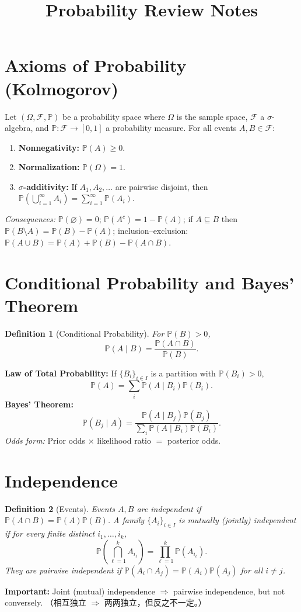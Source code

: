 \documentclass[11pt]{article}
\title{Probability Review Notes}
\author{}
\date{}
\newtheorem{definition}{Definition}
\newcommand{\Pbb}{\mathbb{P}}
\newcommand{\1}{\mathbf{1}}
\begin{document}
\maketitle

\section{Axioms of Probability (Kolmogorov)}
Let $(\Omega,\mathcal{F},\Pbb)$ be a probability space where $\Omega$ is the sample space, $\mathcal{F}$ a $\sigma$-algebra, and $\Pbb:\mathcal{F}\to[0,1]$ a probability measure. For all events $A,B\in\mathcal{F}$:
\begin{enumerate}[label=(\alph*)]
  \item \textbf{Nonnegativity:} $\Pbb(A)\ge 0$.
  \item \textbf{Normalization:} $\Pbb(\Omega)=1$.
  \item \textbf{$\sigma$-additivity:} If $A_1,A_2,\dots$ are pairwise disjoint, then
  $\Pbb\!\left(\bigcup_{i=1}^\infty A_i\right) = \sum_{i=1}^\infty \Pbb(A_i)$.
\end{enumerate}
\textit{Consequences:} $\Pbb(\varnothing)=0$; $\Pbb(A^c)=1-\Pbb(A)$; if $A\subseteq B$ then $\Pbb(B\setminus A)=\Pbb(B)-\Pbb(A)$; inclusion–exclusion:
$\Pbb(A\cup B)=\Pbb(A)+\Pbb(B)-\Pbb(A\cap B)$.

\section{Conditional Probability and Bayes' Theorem}
\begin{definition}[Conditional Probability]
For $\Pbb(B)>0$,
\[
  \Pbb(A\mid B)=\frac{\Pbb(A\cap B)}{\Pbb(B)}.
\]
\end{definition}
\noindent\textbf{Law of Total Probability:} If $\{B_i\}_{i\in I}$ is a partition with $\Pbb(B_i)>0$,
\[
  \Pbb(A)=\sum_{i}\Pbb(A\mid B_i)\Pbb(B_i).
\]
\noindent\textbf{Bayes' Theorem:}
\[
  \Pbb(B_j\mid A)=\frac{\Pbb(A\mid B_j)\Pbb(B_j)}{\sum_i \Pbb(A\mid B_i)\Pbb(B_i)}.
\]
\textit{Odds form:} Prior odds $\times$ likelihood ratio $=$ posterior odds.

\section{Independence}
\begin{definition}[Events]
Events $A,B$ are \emph{independent} if $\Pbb(A\cap B)=\Pbb(A)\Pbb(B)$.
A family $\{A_i\}_{i\in I}$ is \emph{mutually (jointly) independent} if for every finite distinct $i_1,\dots,i_k$,
\[
  \Pbb\!\left(\bigcap_{\ell=1}^k A_{i_\ell}\right)=\prod_{\ell=1}^k \Pbb(A_{i_\ell}).
\]
They are \emph{pairwise independent} if $\Pbb(A_i\cap A_j)=\Pbb(A_i)\Pbb(A_j)$ for all $i\ne j$.
\end{definition}
\textbf{Important:} Joint (mutual) independence $\Rightarrow$ pairwise independence, but not conversely. （相互独立 $\Rightarrow$ 两两独立，但反之不一定。）
\end{document}
